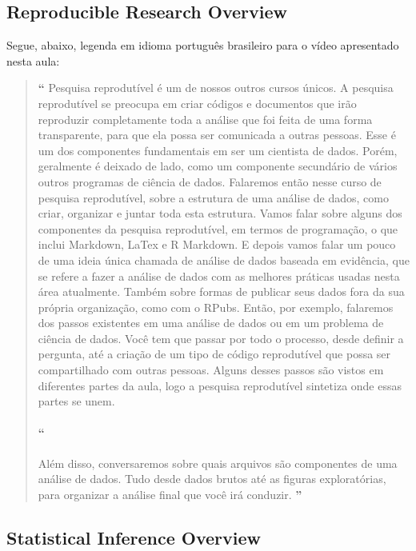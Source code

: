 \subsection{Reproducible Research Overview}

Segue, abaixo, legenda em idioma português brasileiro para o vídeo apresentado nesta aula:

\begin{quotation}%
\begin{small}
{\large\textbf{``}}%
Pesquisa reprodutível é um de nossos outros cursos únicos. A pesquisa reprodutível se preocupa em criar códigos e documentos que irão reproduzir completamente toda a análise que foi feita de uma forma transparente, para que ela possa ser comunicada a outras pessoas. Esse é um dos componentes fundamentais em ser um cientista de dados. Porém, geralmente é deixado de lado, como um componente secundário de vários outros programas de ciência de dados. Falaremos então nesse curso de pesquisa reprodutível, sobre a estrutura de uma análise de dados, como criar, organizar e juntar toda esta estrutura. Vamos falar sobre alguns dos componentes da pesquisa reprodutível, em termos de programação, o que inclui Markdown, LaTex e R Markdown. E depois vamos falar um pouco de uma ideia única chamada de análise de dados baseada em evidência, que se refere a fazer a análise de dados com as melhores práticas usadas nesta área atualmente. Também sobre formas de publicar seus dados fora da sua própria organização, como com o RPubs. Então, por exemplo, falaremos dos passos existentes em uma análise de dados ou em um problema de ciência de dados. Você tem que passar por todo o processo, desde definir a pergunta, até a criação de um tipo de código reprodutível que possa ser compartilhado com outras pessoas. Alguns desses passos são vistos em diferentes partes da aula, logo a pesquisa reprodutível sintetiza onde essas partes se unem. 

\paragraph{``}
Além disso, conversaremos sobre quais arquivos são componentes de uma análise de dados. Tudo desde dados brutos até as figuras exploratórias, para organizar a análise final que você irá conduzir. 
{\large\textbf{''}}
\end{small}
\end{quotation}


\subsection{Statistical Inference Overview}

